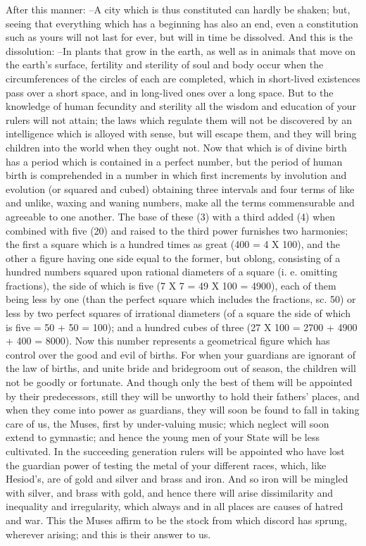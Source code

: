 After this manner: --A city which is thus constituted can hardly be shaken; but, seeing that everything which has a beginning has also an end, even a constitution such as yours will not last for ever, but will in time be dissolved. And this is the dissolution: --In plants that grow in the earth, as well as in animals that move on the earth's surface, fertility and sterility of soul and body occur when the circumferences of the circles of each are completed, which in short-lived existences pass over a short space, and in long-lived ones over a long space. But to the knowledge of human fecundity and sterility all the wisdom and education of your rulers will not attain; the laws which regulate them will not be discovered by an intelligence which is alloyed with sense, but will escape them, and they will bring children into the world when they ought not. Now that which is of divine birth has a period which is contained in a perfect number, but the period of human birth is comprehended in a number in which first increments by involution and evolution (or squared and cubed) obtaining three intervals and four terms of like and unlike, waxing and waning numbers, make all the terms commensurable and agreeable to one another. The base of these (3) with a third added (4) when combined with five (20) and raised to the third power furnishes two harmonies; the first a square which is a hundred times as great (400 = 4 X 100), and the other a figure having one side equal to the former, but oblong, consisting of a hundred numbers squared upon rational diameters of a square (i. e. omitting fractions), the side of which is five (7 X 7 = 49 X 100 = 4900), each of them being less by one (than the perfect square which includes the fractions, sc. 50) or less by two perfect squares of irrational diameters (of a square the side of which is five = 50 + 50 = 100); and a hundred cubes of three (27 X 100 = 2700 + 4900 + 400 = 8000). Now this number represents a geometrical figure which has control over the good and evil of births. For when your guardians are ignorant of the law of births, and unite bride and bridegroom out of season, the children will not be goodly or fortunate. And though only the best of them will be appointed by their predecessors, still they will be unworthy to hold their fathers' places, and when they come into power as guardians, they will soon be found to fall in taking care of us, the Muses, first by under-valuing music; which neglect will soon extend to gymnastic; and hence the young men of your State will be less cultivated. In the succeeding generation rulers will be appointed who have lost the guardian power of testing the metal of your different races, which, like Hesiod's, are of gold and silver and brass and iron. And so iron will be mingled with silver, and brass with gold, and hence there will arise dissimilarity and inequality and irregularity, which always and in all places are causes of hatred and war. This the Muses affirm to be the stock from which discord has sprung, wherever arising; and this is their answer to us.

